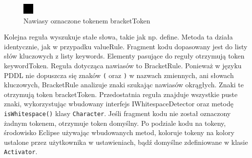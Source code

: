 \begin{figure}[h]
  \centering
    \includegraphics{img/bracket-color.png}
    \caption{Nawiasy oznaczone tokenem bracketToken}
    \label{ana_structure}
\end{figure}
Kolejna reguła wyszukuje stałe słowa, takie jak np. define. Metoda ta działa identycznie, jak w przypadku valueRule. Fragment kodu dopasowany jest do listy słów kluczowych z listy keywords. Elementy pasujące do reguły otrzymują token keywordToken. Reguła dotycząca nawiasów to BracketRule. Ponieważ w języku PDDL nie dopuszcza się znaków \texttt{(} oraz \texttt{)} w nazwach zmiennych, ani słowach kluczowych, BracketRule analizuje znaki szukając nawiasów okrągłych. Znaki te otrzymują token bracketToken.
Przedostatnia reguła znajduje wszystkie puste znaki, wykorzystując wbudowany interfejs  IWhitespaceDetector oraz metodę \texttt{isWhitespace()} klasy \texttt{Character}. Jeśli fragment kodu nie został oznaczony żadnym tokenem, otrzymuje token domyślny.  Po podziale kodu na tokeny, środowisko Eclipse używając wbudowanych metod, koloruje tokeny na kolory ustalone przez użytkownika w ustawieniach, bądź domyślne zdefiniowane w klasie \texttt{Activator}.

